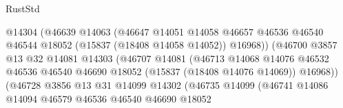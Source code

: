 \begin{lexlean}{RustStd}
\begin{coremodule}
                                            @14304
                                            (@46639
                                              @14063
                                              (@46647
                                                @14051
                                                @14058
                                                @46657
                                                @46536
                                                @46540
                                                @46544
                                                @18052
                                                (@15837 (@18408 @14058 @14052))
                                                @16968))
                                            (@46700
                                              @3857
                                              @13
                                              @32
                                              @14081
                                              @14303
                                              (@46707
                                                @14081
                                                (@46713
                                                  @14068
                                                  @14076
                                                  @46532
                                                  @46536
                                                  @46540
                                                  @46690
                                                  @18052
                                                  (@15837 (@18408 @14076 @14069))
                                                  @16968))
                                              (@46728
                                                @3856
                                                @13
                                                @31
                                                @14099
                                                @14302
                                                (@46735
                                                  @14099
                                                  (@46741
                                                    @14086
                                                    @14094
                                                    @46579
                                                    @46536
                                                    @46540
                                                    @46690
                                                    @18052

\end{coremodule}
\end{lexlean}

